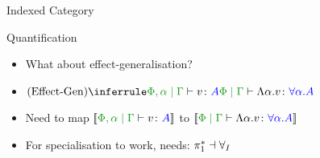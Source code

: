 \documentclass{beamer}
\newcommand\script[1]{}
\begin{document}
\begin{frame}{Indexed Category}


    \script{
        - So now we can construct this structure
        - called an index category
        - We have a functor mapping each object representing an effect-variable environment to the relevant S-category fibre.
        - Also contravariantly, meaning the direction of the morphism changes, maps morphisms in the base category to re-indexing functors between the relevant fibres.
        - So now we can perform substitutions and weakenings on the effect environment and get the right behaviour on the semantics of the EC instantiation
    }
    
\end{frame}

\begin{frame}{Quantification}
    \begin{itemize}
        \item What about effect-generalisation?
        \item $\ntreeruleI{Effect-Gen}{\etyperelation{\P,\a}{\G}{v}{A}}{\etyperelation{\P}{\G}{\elam{\a}{v}}{\all{\a}{A}}}$
        \item Need to map $\deno{\etyperelation{\P,\a}{\G}{v}{A}}$ to $\deno{\etyperelation{\P}{\G}{\elam{\a}{v}}{\all{\a}{A}}}$
        \item For specialisation to work, needs: $\pi_1^*\dashv\forall_I$
    \end{itemize}


    
    \script{
        - We now need to think about the polymorphic terms
        - For quantification, we need another functor, $\allI$ which maps a type rule with an extra effect variable to one quantified over that variable
        - In order for specialisation to work, this quantification functor needs to be a right adjoint to the opposite operation of weakening the effect environment
        - Adjunction of functors is essentially a weaker version of an isomorphism of the categories they're between.
        - Going out on one functor and coming back on the other isn't quite the same as the identity, but it has a well defined action.
    }

\end{frame}
    
\end{document}
